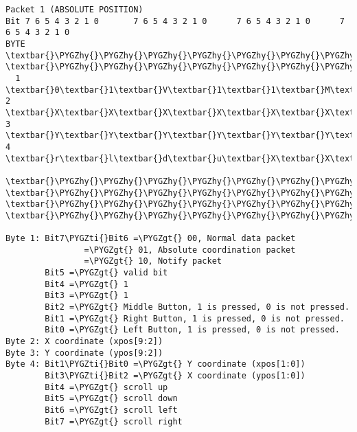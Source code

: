 \documentclass[a4paper,8pt,english]{sphinxmanual}
\def\PYGZgt{\char`\>}
\def\PYGZhy{\char`\-}
\def\PYGZti{\char`\~}
\begin{document}
\begin{Verbatim}[commandchars=\\\{\}]
Packet 1 (ABSOLUTE POSITION)
Bit 7 6 5 4 3 2 1 0       7 6 5 4 3 2 1 0      7 6 5 4 3 2 1 0      7 6 5 4 3 2 1 0
BYTE  \textbar{}\PYGZhy{}\PYGZhy{}\PYGZhy{}\PYGZhy{}\PYGZhy{}\PYGZhy{}\PYGZhy{}\PYGZhy{}\PYGZhy{}\PYGZhy{}\PYGZhy{}\PYGZhy{}\PYGZhy{}\PYGZhy{}\PYGZhy{}\textbar{}BYTE \textbar{}\PYGZhy{}\PYGZhy{}\PYGZhy{}\PYGZhy{}\PYGZhy{}\PYGZhy{}\PYGZhy{}\PYGZhy{}\PYGZhy{}\PYGZhy{}\PYGZhy{}\PYGZhy{}\PYGZhy{}\PYGZhy{}\PYGZhy{}\textbar{}BYTE\textbar{}\PYGZhy{}\PYGZhy{}\PYGZhy{}\PYGZhy{}\PYGZhy{}\PYGZhy{}\PYGZhy{}\PYGZhy{}\PYGZhy{}\PYGZhy{}\PYGZhy{}\PYGZhy{}\PYGZhy{}\PYGZhy{}\PYGZhy{}\textbar{}BYTE\textbar{}\PYGZhy{}\PYGZhy{}\PYGZhy{}\PYGZhy{}\PYGZhy{}\PYGZhy{}\PYGZhy{}\PYGZhy{}\PYGZhy{}\PYGZhy{}\PYGZhy{}\PYGZhy{}\PYGZhy{}\PYGZhy{}\PYGZhy{}\textbar{}
  1   \textbar{}0\textbar{}1\textbar{}V\textbar{}1\textbar{}1\textbar{}M\textbar{}R\textbar{}L\textbar{}  2  \textbar{}X\textbar{}X\textbar{}X\textbar{}X\textbar{}X\textbar{}X\textbar{}X\textbar{}X\textbar{}  3 \textbar{}Y\textbar{}Y\textbar{}Y\textbar{}Y\textbar{}Y\textbar{}Y\textbar{}Y\textbar{}Y\textbar{}  4 \textbar{}r\textbar{}l\textbar{}d\textbar{}u\textbar{}X\textbar{}X\textbar{}Y\textbar{}Y\textbar{}
      \textbar{}\PYGZhy{}\PYGZhy{}\PYGZhy{}\PYGZhy{}\PYGZhy{}\PYGZhy{}\PYGZhy{}\PYGZhy{}\PYGZhy{}\PYGZhy{}\PYGZhy{}\PYGZhy{}\PYGZhy{}\PYGZhy{}\PYGZhy{}\textbar{}     \textbar{}\PYGZhy{}\PYGZhy{}\PYGZhy{}\PYGZhy{}\PYGZhy{}\PYGZhy{}\PYGZhy{}\PYGZhy{}\PYGZhy{}\PYGZhy{}\PYGZhy{}\PYGZhy{}\PYGZhy{}\PYGZhy{}\PYGZhy{}\textbar{}    \textbar{}\PYGZhy{}\PYGZhy{}\PYGZhy{}\PYGZhy{}\PYGZhy{}\PYGZhy{}\PYGZhy{}\PYGZhy{}\PYGZhy{}\PYGZhy{}\PYGZhy{}\PYGZhy{}\PYGZhy{}\PYGZhy{}\PYGZhy{}\textbar{}    \textbar{}\PYGZhy{}\PYGZhy{}\PYGZhy{}\PYGZhy{}\PYGZhy{}\PYGZhy{}\PYGZhy{}\PYGZhy{}\PYGZhy{}\PYGZhy{}\PYGZhy{}\PYGZhy{}\PYGZhy{}\PYGZhy{}\PYGZhy{}\textbar{}

Byte 1: Bit7\PYGZti{}Bit6 =\PYGZgt{} 00, Normal data packet
                =\PYGZgt{} 01, Absolute coordination packet
                =\PYGZgt{} 10, Notify packet
        Bit5 =\PYGZgt{} valid bit
        Bit4 =\PYGZgt{} 1
        Bit3 =\PYGZgt{} 1
        Bit2 =\PYGZgt{} Middle Button, 1 is pressed, 0 is not pressed.
        Bit1 =\PYGZgt{} Right Button, 1 is pressed, 0 is not pressed.
        Bit0 =\PYGZgt{} Left Button, 1 is pressed, 0 is not pressed.
Byte 2: X coordinate (xpos[9:2])
Byte 3: Y coordinate (ypos[9:2])
Byte 4: Bit1\PYGZti{}Bit0 =\PYGZgt{} Y coordinate (xpos[1:0])
        Bit3\PYGZti{}Bit2 =\PYGZgt{} X coordinate (ypos[1:0])
        Bit4 =\PYGZgt{} scroll up
        Bit5 =\PYGZgt{} scroll down
        Bit6 =\PYGZgt{} scroll left
        Bit7 =\PYGZgt{} scroll right


\end{Verbatim}
\end{document}
